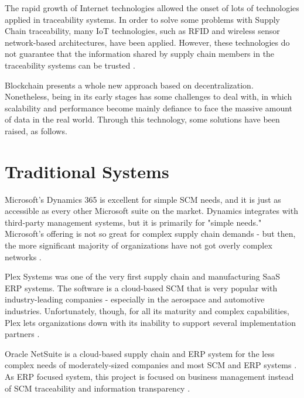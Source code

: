 \label{chap:RelatedWork}

\acresetall 

The rapid growth of Internet technologies allowed the onset of lots of technologies applied in traceability systems. In order to solve some problems with Supply Chain traceability, many \ac{IoT} technologies, such as \ac{RFID} and wireless sensor network-based architectures, have been applied. However, these technologies do not guarantee that the information shared by supply chain members in the traceability systems can be trusted \cite{tian2017supply}.

Blockchain presents a whole new approach based on decentralization. Nonetheless, being in its early stages has some challenges to deal with, in which scalability and performance become mainly defiance to face the massive amount of data in the real world. Through this technology, some solutions have been raised, as follows.

\section{Traditional Systems} \label{sec:TraditionalSystems}

Microsoft's Dynamics 365 is excellent for simple SCM needs, and it is just as accessible as every other Microsoft suite on the market. Dynamics integrates with third-party management systems, but it is primarily for "simple needs." Microsoft's offering is not so great for complex supply chain demands - but then, the  more significant majority of organizations have not got overly complex networks \cite{bellu2018microsoft}.

Plex Systems was one of the very first supply chain and manufacturing \ac{SaaS} ERP systems. The software is a cloud-based SCM that is very popular with industry-leading companies - especially in the aerospace and automotive industries. Unfortunately, though, for all its maturity and complex capabilities, Plex lets organizations down with its inability to support several implementation partners \cite{plex}.

Oracle NetSuite is a cloud-based supply chain and ERP system for the less complex needs of moderately-sized companies and most SCM and ERP systems \cite{rolling2016using}. As ERP focused system, this project is focused on business management instead of SCM traceability and information transparency \cite{rolling2016using}.

